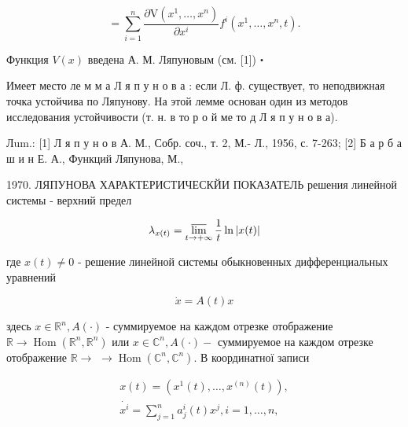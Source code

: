 \documentclass[10pt]{article}
\begin{document}
\[

=\sum_{i=1}^{n} \frac{\partial \mathrm{V}\left(x^{1}, \ldots, x^{n}\right)}{\partial x^{i}} f^{i}\left(x^{1}, \ldots, x^{n}, t\right) .

\]



Функция $V(x)$ введена А. М. Ляпуновым (см. [1])・



Имеет место ле м м а Л я п у н о в а : если Л. ф. существует, то неподвижная точка устойчива по Ляпунову. На этой лемме основан один из методов исследования устойчивости (т. н. в то р о й ме то д Л я п у н о в а).



Лum.: [1] Л я п у н о в А. М., Собр. соч., т. 2, М.- Л., 1956, с. 7-263; [2] Б а р б а ш и н Е. А., Функций Ляпунова, М.,

1970. ЛЯПУНОВА ХАРАКТЕРИСТИЧЕСКЙИ ПОКАЗАТЕЛЬ решения линейной системы - верхний предел



\[

\lambda_{x(t)}=\varlimsup_{t \rightarrow+\infty} \frac{1}{t} \ln |x(t)|

\]



где $x(t) \neq 0$ - решение линейной системы обыкновенных дифференциальных уравнений



\[

\dot{x}=A(t) x

\]



здесь $x \in \mathbb{R}^{n}, A(\cdot)$ - суммируемое на каждом отрезке отображение $\mathbb{R} \rightarrow \operatorname{Hom}\left(\mathbb{R}^{n}, \mathbb{R}^{n}\right)$ или $x \in \mathbb{C}^{n}, A(\cdot)-$ суммируемое на каждом отрезке отображение $\mathbb{R} \rightarrow$ $\rightarrow \operatorname{Hom}\left(\mathbb{C}^{n}, \mathbb{C}^{n}\right)$. В координатної записи



\[

\begin{gathered}

x(t)=\left(x^{1}(t), \ldots, x^{(n)}(t)\right), \\

\dot{x^{i}}=\sum_{j=1}^{n} a_{j}^{i}(t) x^{j}, i=1, \ldots, n,

\end{gathered}

\]
\end{document}
